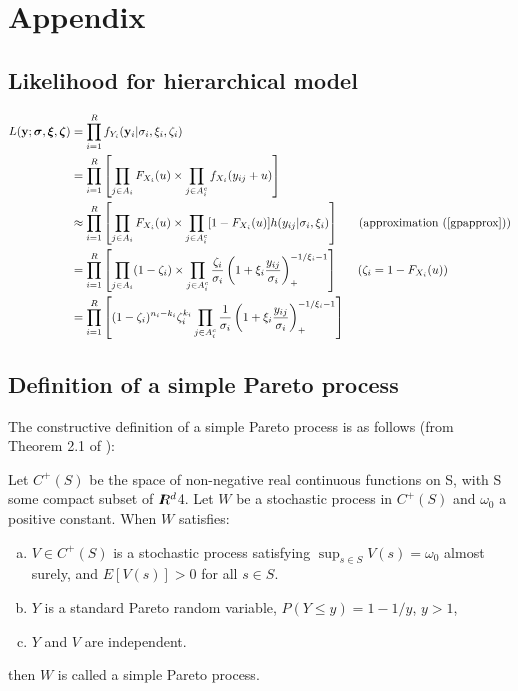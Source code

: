 \appendix
\section{Appendix}

\subsection{Likelihood for hierarchical model}

\begin{align}
L(\mathbf{\bm{y}}; \mathbf{\bm{\sigma}}, \mathbf{\bm{\xi}}, \mathbf{\bm{\zeta}}) &= \prod_{i=1}^R f_{Y_i}(\mathbf{\bm{y}}_i|\sigma_i,\xi_i,\zeta_i) \nonumber \\
&= \prod_{i=1}^R\left[\prod_{j\in A_i} F_{X_i}(u) \times \prod_{j\in A_i^c} f_{X_i}(y_{ij}+u)\right] \nonumber \\
&\approx \prod_{i=1}^R\left[\prod_{j\in A_i} F_{X_i}(u) \times \prod_{j\in A_i^c} [1-F_{X_i}(u)]h(y_{ij}|\sigma_i,\xi_i)\right]~~~~~\mathrm{(approximation~(\ref{gpapprox}))} \nonumber \\
&= \prod_{i=1}^R\left[\prod_{j\in A_i} (1-\zeta_i)\times \prod_{j\in A_i^c} \frac{\zeta_i}{\sigma_i}\left(1+\xi_i\frac{y_{ij}}{\sigma_i}\right)_+^{-1/\xi_i-1}\right]~~~~~(\zeta_i=1-F_{X_i}(u)) \nonumber \\
&= \prod_{i=1}^R\left[(1-\zeta_i)^{n_i-k_i}\zeta_i^{k_i}\prod_{j\in A_i^c}\frac{1}{\sigma_i}\left(1+\xi_i\frac{y_{ij}}{\sigma_i}\right)_+^{-1/\xi_i-1}\right] \label{biglike}
\end{align}

\subsection{Definition of a simple Pareto process}
\label{def_spp}

The constructive definition of a simple Pareto process is as follows (from Theorem 2.1 of \cite{ferreira2014generalized}):

Let $C^+(S)$ be the space of non-negative real continuous functions on S, with S some compact subset of $I\hspace{-4.4pt}R^d$4. Let $W$ be a stochastic process in $C^+(S)$ and $\omega_0$ a positive constant. When $W$ satisfies:
\begin{enumerate}[(a)]
\item $V\in C^+(S)$ is a stochastic process satisfying $\sup_{s\in S} V(s)=\omega_0$ almost surely, and $E[V(s)] > 0$ for all $s\in S$.
\item $Y$ is a standard Pareto random variable, $P(Y\leq y)=1-1/y$, $y>1$,
\item $Y$ and $V$ are independent.
\end{enumerate}
then $W$ is called a simple Pareto process.


